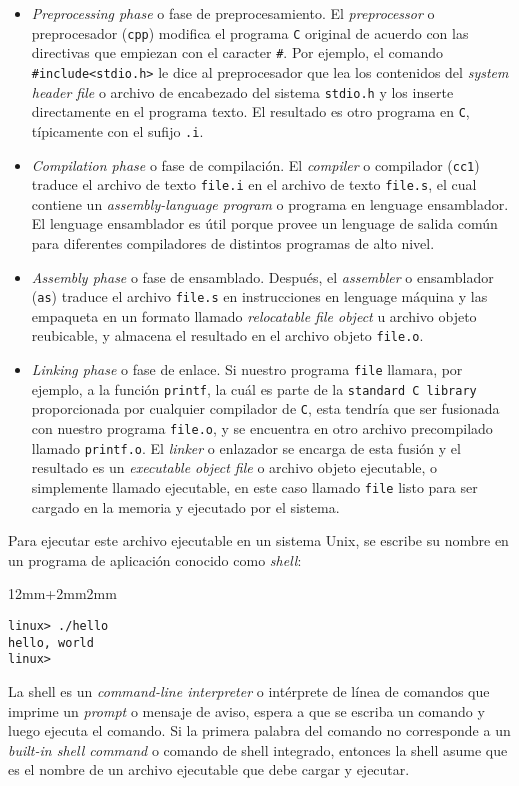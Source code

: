 \begin{itemize}
\item \textit{Preprocessing phase} o fase de preprocesamiento. El \textit{preprocessor} o preprocesador (\texttt{cpp}) modifica el programa \texttt{C} original de acuerdo con las directivas que empiezan con el caracter \texttt{\#}. Por ejemplo, el comando \texttt{\#include<stdio.h>} le dice al preprocesador que lea los contenidos del \textit{system header file} o archivo de encabezado del sistema \texttt{stdio.h} y los inserte directamente en el programa texto. El resultado es otro programa en \texttt{C}, típicamente con el sufijo \texttt{.i}. 
\item \textit{Compilation phase} o fase de compilación. El \textit{compiler} o compilador (\texttt{cc1}) traduce el archivo de texto \texttt{file.i} en el archivo de texto \texttt{file.s}, el cual contiene un \textit{assembly-language program} o programa en lenguage ensamblador. El lenguage ensamblador es útil porque provee un lenguage de salida común para diferentes compiladores de distintos programas de alto nivel. 
\item \textit{Assembly phase} o fase de ensamblado. Después, el \textit{assembler} o ensamblador (\texttt{as}) traduce el archivo \texttt{file.s} en instrucciones en lenguage máquina y las empaqueta en un formato llamado \textit{relocatable file object} u archivo objeto reubicable, y almacena el resultado en el archivo objeto \texttt{file.o}. 
\item \textit{Linking phase} o fase de enlace. Si nuestro programa \texttt{file} llamara, por ejemplo, a la función \texttt{printf}, la cuál es parte de la \texttt{standard C library} proporcionada por cualquier compilador de \texttt{C}, esta tendría que ser fusionada con nuestro programa \texttt{file.o}, y se encuentra en otro archivo precompilado llamado \texttt{printf.o}. El \textit{linker} o enlazador se encarga de esta fusión y el resultado es un \textit{executable object file} o archivo objeto ejecutable, o simplemente llamado ejecutable, en este caso llamado \texttt{file} listo para ser cargado en la memoria y ejecutado por el sistema.
\end{itemize}

Para ejecutar este archivo ejecutable en un sistema Unix, se escribe su nombre en un programa de aplicación conocido como \textit{shell}:

{
\renewcommand\ttdefault{cmtt}
\begin{adjustwidth}{12mm+2mm}{2mm}
\begin{lstlisting}
linux> ./hello
hello, world
linux>
\end{lstlisting}
\end{adjustwidth}
}

La shell es un \textit{command-line interpreter} o intérprete de línea de comandos que imprime un \textit{prompt} o mensaje de aviso, espera a que se escriba un comando y luego ejecuta el comando. Si la primera palabra del comando no corresponde a un \textit{built-in shell command} o comando de shell integrado, entonces la shell asume que es el nombre de un archivo ejecutable que debe cargar y ejecutar.
